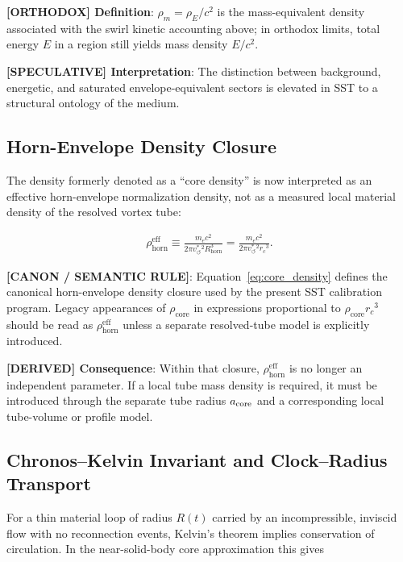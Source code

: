 \documentclass[11pt]{article}
\theoremstyle{definition}
\theoremstyle{plain}
\theoremstyle{remark}
\newcommand{\rhoE}{\rho_{\!E}}
\newcommand{\rhoM}{\rho_{\!m}}
\newcommand{\rhocore}{\rho_{\mathrm{core}}}
\newcommand{\rhohorn}{\rho_{\mathrm{horn}}^{\mathrm{eff}}}
\newcommand{\rc}{{r_c}}
\newcommand{\vchar}{v_{\!\boldsymbol{\circlearrowleft}}^{\ast}}
\begin{document}
        \textbf{[ORTHODOX] Definition}: $\rhoM=\rhoE/c^2$ is the mass-equivalent density associated with the swirl kinetic accounting above; in orthodox limits, total energy $E$ in a region still yields mass density $E/c^2$.

        \textbf{[SPECULATIVE] Interpretation}: The distinction between background, energetic, and saturated envelope-equivalent sectors is elevated in SST to a structural ontology of the medium.
    
    \subsection{Horn-Envelope Density Closure}
        
        The density formerly denoted as a ``core density'' is now interpreted as an
        effective horn-envelope normalization density, not as a measured local
        material density of the resolved vortex tube:
        
        \begin{align}
            \rhohorn
            \equiv
            \frac{m_e c^2}{2\pi \vchar{}^2 R_{\mathrm{horn}}^3}
            =
            \frac{m_e c^2}{2\pi \vchar{}^2 \rc^3}.
            \label{eq:core_density}
        \end{align}
        
        \textbf{[CANON / SEMANTIC RULE]}: Equation~\eqref{eq:core_density}
        defines the canonical horn-envelope density closure used by the present
        SST calibration program. Legacy appearances of $\rhocore$ in expressions
        proportional to $\rhocore\rc^3$ should be read as $\rhohorn$ unless a
        separate resolved-tube model is explicitly introduced.

        \textbf{[DERIVED] Consequence}: Within that closure, $\rhohorn$ is no
        longer an independent parameter. If a local tube mass density is required,
        it must be introduced through the separate tube radius $a_{\rm core}$ and
        a corresponding local tube-volume or profile model.


    \subsection{Chronos--Kelvin Invariant and Clock--Radius Transport}
        \label{subsec:chronos_kelvin}

        For a thin material loop of radius $R(t)$ carried by an incompressible, inviscid flow with no reconnection events, Kelvin's theorem implies conservation of circulation. In the near-solid-body core approximation this gives
\end{document}
